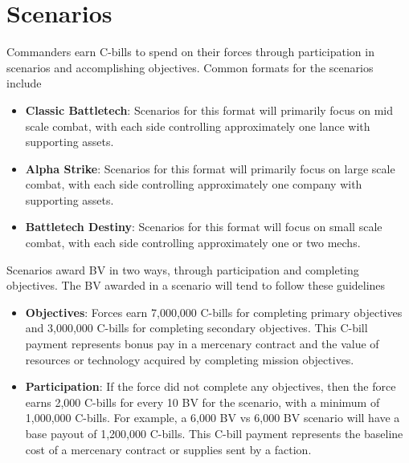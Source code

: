 \documentclass[UTF8]{article}
\begin{document}
\newpage

\section{Scenarios}

Commanders earn C-bills to spend on their forces through participation in scenarios and accomplishing objectives.
Common formats for the scenarios include

\begin{itemize}

\item {\bf Classic Battletech}: Scenarios for this format will primarily focus on mid scale combat, with each side controlling approximately one lance with supporting assets.

\item {\bf Alpha Strike}: Scenarios for this format will primarily focus on large scale combat, with each side controlling approximately one company with supporting assets.

\item {\bf Battletech Destiny}: Scenarios for this format will focus on small scale combat, with each side controlling approximately one or two mechs.

\end{itemize}

Scenarios award BV in two ways, through participation and completing objectives.
The BV awarded in a scenario will tend to follow these guidelines

\begin{itemize}

\item {\bf Objectives}: Forces earn 7,000,000 C-bills for completing primary objectives and 3,000,000 C-bills for completing secondary objectives.
This C-bill payment represents bonus pay in a mercenary contract and the value of resources or technology acquired by completing mission objectives.

\item {\bf Participation}: If the force did not complete any objectives, then the force earns 2,000 C-bills for every 10 BV for the scenario, with a minimum of 1,000,000 C-bills.
For example, a 6,000 BV vs 6,000 BV scenario will have a base payout of 1,200,000 C-bills.
This C-bill payment represents the baseline cost of a mercenary contract or supplies sent by a faction.

\end{itemize}
\end{document}
